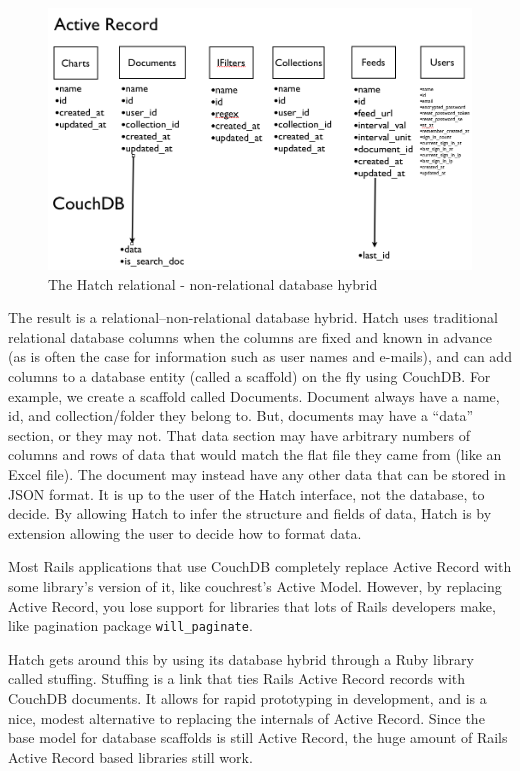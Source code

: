 \begin{figure}[h]
	\begin{center}
	\includegraphics[width=120mm]{images/hatch_db_hybrid}
	\caption{The Hatch relational - non-relational database hybrid} 
	\label{hatch_db_hybrid}
	\end{center}
\end{figure}

The result is a relational--non-relational database hybrid. Hatch uses traditional 
relational database columns when the columns are fixed and known in advance (as is
often the case for information such as user names and e-mails), and can add columns to
a database entity (called a scaffold) on the fly using CouchDB. For example, we create
a scaffold called Documents. Document always have a name, id, and collection/folder
they belong to. But, documents may have a ``data'' section, or they may not. That
data section may have arbitrary numbers of columns and rows of data that would match the flat 
file they came from (like an Excel file). The document may instead have any other data that
can be stored in JSON format. It is up to the user of the Hatch interface, not the database, to 
decide. By allowing Hatch to infer the structure and fields of data, Hatch
is by extension allowing the user to decide how to format data.

Most Rails applications that use CouchDB completely replace Active Record with some
library's version of it, like couchrest's Active Model. However, by replacing
Active Record, you lose support for libraries that lots of Rails developers
make, like pagination package \texttt{will\_paginate}. 

Hatch gets around this by using its database hybrid through a Ruby library called
stuffing. Stuffing is a link that ties Rails Active Record records with
CouchDB documents. It allows for rapid prototyping in development, and is a nice, modest
alternative to replacing the internals of Active Record. Since the base model for 
database scaffolds is still Active Record, the huge amount of Rails Active Record based
libraries still work.

